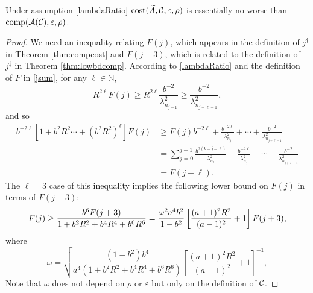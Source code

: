 \documentclass[graybox,footinfo]{svmult}
\begin{document}
\begin{theorem}
\label{thm:CostNoWorse}
Under assumption \eqref{lambdaRatio} $\textup{cost}(\widetilde{A},{\mathcal{C}}, \varepsilon,\rho)$ is essentially no worse than $\textup{comp}({\mathcal{A}}({\mathcal{C}}),\varepsilon,\rho)$. 
\end{theorem}
\begin{proof} 
We need an inequality relating $F(j)$, which appears in the definition of $j^\dagger$ in Theorem \ref{thm:compcost} and $F(j+3)$, which is related to the definition of $j^\ddagger$ in Theorem \ref{thm:lowbdcomp}.  According to \eqref{lambdaRatio} and the definition of $F$ in \eqref{jsum}, for any $\ell \in \mathbb{N}$,
\begin{equation*}
R^{2\ell} F(j) \ge R^{2\ell} \frac{b^{-2}}{\lambda_{n_{j-1}}^2} \geq \frac{b^{-2}}{\lambda_{n_{j+\ell-1}}^2},
\end{equation*}
and so
\begin{align*}
b^{-2\ell}[1 + b^2R^2\cdots + (b^2R^2)^\ell] F(j) & \ge F(j)b^{-2\ell} + \frac{b^{-2\ell}}{\lambda_{n_{j}}^2} + \cdots + \frac{b^{-2}}{\lambda_{n_{j+\ell-1}}^2} \\
& = \sum_{j=0}^{j-1} \frac{b^{2(k - j -\ell)}}{\lambda_{n_{k}}^2} + \frac{b^{-2\ell}}{\lambda_{n_{j}}^2} + \cdots + \frac{b^{-2}}{\lambda_{n_{j+\ell-1}}^2} \\
& = F(j + \ell).
\end{align*}
The $\ell=3$ case of this inequality implies the following lower bound on $F(j)$ in terms of $F(j+3)$:
\begin{equation*} 
F(j) \ge  \frac{b^6 F(j+3)}{1 + b^2R^2 + b^4R^4 + b^6R^6} \\
=  \frac{\omega^2 a^4 b^2}{1 - b^2}\left[\frac{(a+1)^{2} R^2 }{(a-1)^2} + 1\right] F(j+3),
\end{equation*}
where
\begin{equation} \label{newomegadef}
\omega = \sqrt{\frac{(1 - b^2)b^4}{a^4(1 + b^2R^2 + b^4R^4 + b^6R^6)}\left[\frac{(a+1)^{2} R^2 }{(a-1)^2} + 1\right]^{-1}},
\end{equation}
Note that $\omega$ does not depend on $\rho$ or $\varepsilon$ but only on the definition of ${\mathcal{C}}$.


\end{proof}
\end{document}
